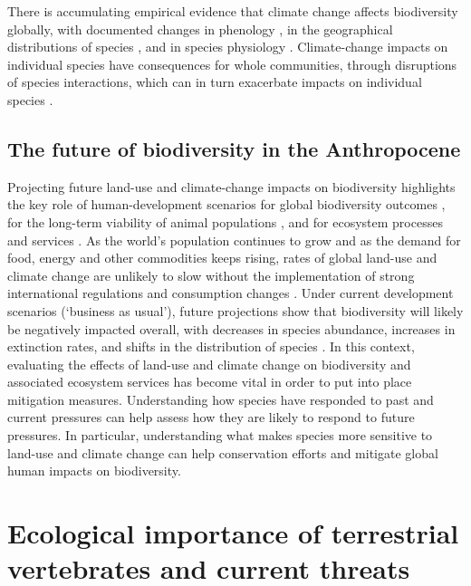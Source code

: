 There is accumulating empirical evidence that climate change affects biodiversity globally, with documented changes in phenology \citep{Inouye2022}, in the geographical distributions of species \citep{Chen2011, Lenoir2015, Soroye2020}, and in species physiology \citep{Portner2008, Chown2010}.  Climate-change impacts on individual species have consequences for whole communities, through disruptions of species interactions, which can in turn exacerbate impacts on individual species \citep{Cahill2013, Kharouba2018}. 


\subsection{The future of biodiversity in the Anthropocene}

Projecting future land-use and climate-change impacts on biodiversity highlights the key role of human-development scenarios for global biodiversity outcomes \citep{Newbold2018, Powell2013}, for the long-term viability of animal populations \citep{Spooner2018}, and for ecosystem processes and services \citep{Lawler2014}. As the world’s population continues to grow and as the demand for food, energy and other commodities keeps rising, rates of global land-use and climate change are unlikely to slow without the implementation of strong international regulations and consumption changes \citep{IPCC2022, Stehfest2019}. Under current development scenarios (`business as usual'), future projections show that biodiversity will likely be negatively impacted overall, with decreases in species abundance, increases in extinction rates, and shifts in the distribution of species \citep{Schipper2020, Pereira2010}. In this context, evaluating the effects of land-use and climate change on biodiversity and associated ecosystem services has become vital in order to put into place mitigation measures. Understanding how species have responded to past and current pressures can help assess how they are likely to respond to future pressures. In particular, understanding what makes species more sensitive to land-use and climate change can help conservation efforts and mitigate global human impacts on biodiversity. 


\section{Ecological importance of terrestrial vertebrates and current threats}

